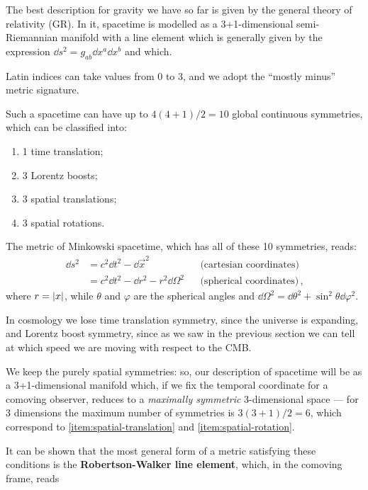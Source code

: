 \documentclass[main.tex]{subfiles}
\begin{document}
The best description for gravity we have so far is given by the general theory of relativity (GR).
In it, spacetime is modelled as a 3+1-dimensional semi-Riemannian manifold with a line element which is  generally given by the expression \(\dd{s^2} = g_{ab} \dd{x^a} \dd{x^b} \) and which.

Latin indices can take values from 0 to 3, and we adopt the ``mostly minus'' metric signature.

Such a spacetime can have up to \(4(4+1) / 2 = 10\) global continuous symmetries, which can be classified into:
\begin{enumerate}[label=(\alph*)]
  \item 1 time translation; \label{item:time-translation}
  \item 3 Lorentz boosts; \label{item:lorentz-boost}
  \item 3 spatial translations; \label{item:spatial-translation}
  \item 3 spatial rotations. \label{item:spatial-rotation}
\end{enumerate}

The metric of Minkowski spacetime, which has all of these 10 symmetries, reads: 
%
\begin{subequations}
\begin{align}
\dd{s^2} &= c^2 \dd{t^2} - \dd{\vec{x}^2} && \text{(cartesian coordinates)} \\
&= c^2 \dd{t^2} - \dd{r^2} - r^2 \dd{\Omega^2} && \text{(spherical coordinates)}
\,,
\end{align}
\end{subequations}
%
where \(r = \abs{x}\), while \(\theta \) and \(\varphi \) are the spherical angles and \(\dd{\Omega^2} = \dd{\theta^2} + \sin^2\theta \dd{\varphi^2 }\).

In cosmology we lose time translation symmetry, since the universe is expanding, and Lorentz boost symmetry, since as we saw in the previous section we can tell at which speed we are moving with respect to the CMB.

We keep the purely spatial symmetries: so, our description of spacetime will be as a 3+1-dimensional manifold which, if we fix the temporal coordinate for a comoving observer, reduces to a \emph{maximally symmetric} 3-dimensional space --- for 3 dimensions the maximum number of symmetries is \(3(3+1) / 2 = 6\), which correspond to \ref{item:spatial-translation} and \ref{item:spatial-rotation}. 

It can be shown that the most general form of a metric satisfying these conditions is the \textbf{Robertson-Walker line element}, which, in the comoving frame, reads
%
%
\end{document}
